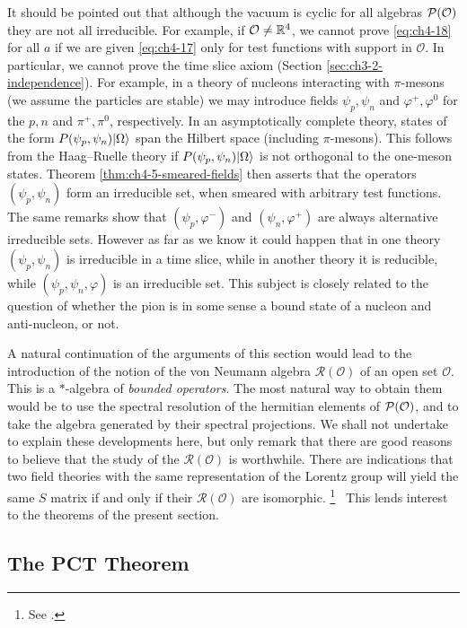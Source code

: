 It should be pointed out that although the vacuum is cyclic for all algebras
$\mathcal{P}(\mathcal O)$ they are not all irreducible. For example, if
$\mathcal O\ne\mathbb{R}^4$, we cannot prove \eqref{eq:ch4-18} for all $a$ if we are given \eqref{eq:ch4-17}
only for test functions with support in $\mathcal O$. In particular, we
cannot prove the time slice axiom (Section \ref{sec:ch3-2-independence}). For example, in a theory of
nucleons interacting with $\pi$-mesons (we assume the particles are stable) we
may introduce fields $\psi_p,\psi_n$ and $\varphi^+,\varphi^0$ for the $p,n$
and $\pi^+,\pi^0$, respectively. In an asymptotically complete theory,
states of the form $P(\psi_p,\psi_n)\lvert \Omega\rangle$ span the Hilbert space
(including $\pi$-mesons). This follows from the Haag--Ruelle theory if
$P(\psi_p,\psi_n)\lvert \Omega\rangle$ is not orthogonal to the one-meson states.
Theorem \ref{thm:ch4-5-smeared-fields} then asserts that the operators $(\psi_p,\psi_n)$ form an
irreducible set, when smeared with arbitrary test functions. The same remarks
show that $(\psi_p,\varphi^-)$ and $(\psi_n,\varphi^+)$ are always alternative
irreducible sets. However as far as we know it could happen that in one theory
$(\psi_p,\psi_n)$ is irreducible in a time slice, while in another theory it
is reducible, while $(\psi_p,\psi_n,\varphi)$ is an irreducible set. This
subject is closely related to the question of whether the pion is in some
sense a bound state of a nucleon and anti-nucleon, or not.

A natural continuation of the arguments of this section would lead to the
introduction of the notion of the von Neumann algebra $\mathcal R(\mathcal O)$
of an open set $\mathcal O$. This is a $*$-algebra of \emph{bounded operators}.
The most natural way to obtain them would be to use the spectral resolution of
the hermitian elements of $\mathcal{P}(\mathcal O)$, and to take the
algebra generated by their spectral projections. We shall not undertake to
explain these developments here, but only remark that there are good reasons
to believe that the study of the $\mathcal R(\mathcal O)$ is worthwhile. There
are indications that two field theories with the same representation of the
Lorentz group will yield the same $S$ matrix if and only if their
$\mathcal R(\mathcal O)$ are isomorphic.%
\begingroup
\renewcommand{\thefootnote}{\ensuremath{\dagger}}%
\footnote{See \cite{pct-ch3-3}.}%
\endgroup
\ This lends interest to the theorems of the present section.

\subsection{The PCT Theorem}
\label{sec:ch4-3-pct-theorem}

